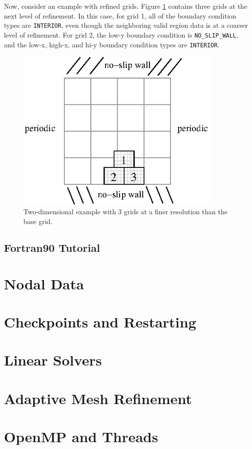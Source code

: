 Now, consider an example with refined grids.  Figure \ref{fig:bc_example3}
contains three grids at the next level of refinement.  In this case, for grid 1,
all of the boundary condition types are {\tt INTERIOR}, even though the neighboring
valid region data is at a coarser level of refinement.  For grid 2, the low-y
boundary condition is {\tt NO\_SLIP\_WALL}, and the low-x, high-x, and hi-y
boundary condition types are {\tt INTERIOR}.
\begin{figure}[tb]
\centering
\includegraphics[width=4in]{./AdvancedTopics/bc_example3}
\caption{\label{fig:bc_example3}Two-dimensional example with 3 grids at a finer
resolution than the base grid.}
\end{figure}

\subsection{Fortran90 Tutorial}

\section{Nodal Data}

\section{Checkpoints and Restarting}

\section{Linear Solvers}

\section{Adaptive Mesh Refinement}

\section{OpenMP and Threads}
